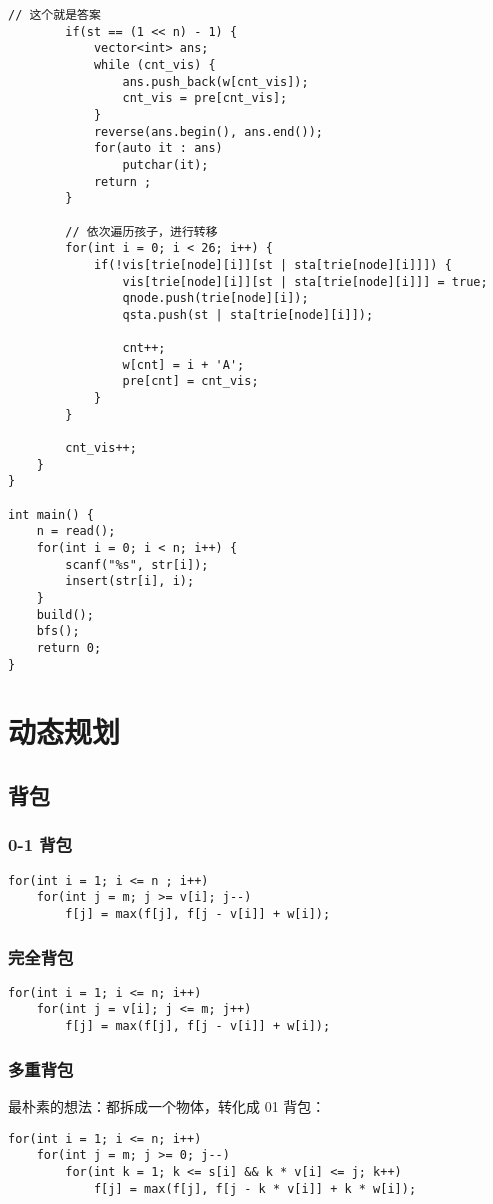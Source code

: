 \documentclass[UTF8]{article}
\begin{document}
\begin{lstlisting}[caption=最短母串问题]
        // 这个就是答案
        if(st == (1 << n) - 1) {
            vector<int> ans;
            while (cnt_vis) {
				ans.push_back(w[cnt_vis]);	
				cnt_vis = pre[cnt_vis];		
			}
			reverse(ans.begin(), ans.end());
            for(auto it : ans)
                putchar(it);
            return ;
        }

        // 依次遍历孩子，进行转移
        for(int i = 0; i < 26; i++) {
            if(!vis[trie[node][i]][st | sta[trie[node][i]]]) {
                vis[trie[node][i]][st | sta[trie[node][i]]] = true;
                qnode.push(trie[node][i]);
                qsta.push(st | sta[trie[node][i]]);
                
                cnt++;
                w[cnt] = i + 'A';
                pre[cnt] = cnt_vis;
            }
        }

        cnt_vis++;
    }
}

int main() {
    n = read();
    for(int i = 0; i < n; i++) {
        scanf("%s", str[i]);
        insert(str[i], i);
    }
    build();
    bfs();
    return 0;
}
\end{lstlisting}



\newpage
\section{动态规划}

\subsection{背包}
\subsubsection{0-1 背包}
\begin{lstlisting}[caption=0-1 背包滚动优化写法]
for(int i = 1; i <= n ; i++)
	for(int j = m; j >= v[i]; j--)
		f[j] = max(f[j], f[j - v[i]] + w[i]);
\end{lstlisting}


\subsubsection{完全背包}
\begin{lstlisting}[caption=完全背包]
for(int i = 1; i <= n; i++)
	for(int j = v[i]; j <= m; j++)
		f[j] = max(f[j], f[j - v[i]] + w[i]);
\end{lstlisting}


\subsubsection{多重背包}
最朴素的想法：都拆成一个物体，转化成 01 背包：
\begin{lstlisting}[caption=多重背包朴素写法]
for(int i = 1; i <= n; i++)
	for(int j = m; j >= 0; j--)
		for(int k = 1; k <= s[i] && k * v[i] <= j; k++)
			f[j] = max(f[j], f[j - k * v[i]] + k * w[i]);
\end{lstlisting}
\end{document}
